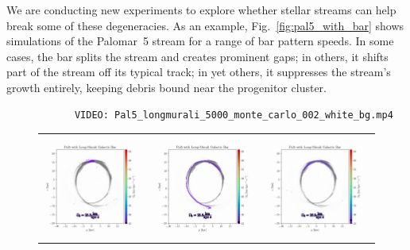         We are conducting new experiments to explore whether stellar streams can help break some of these degeneracies. As an example, Fig.~\ref{fig:pal5_with_bar} shows simulations of the Palomar~5 stream for a range of bar pattern speeds. In some cases, the bar splits the stream and creates prominent gaps; in others, it shifts part of the stream off its typical track; in yet others, it suppresses the stream's growth entirely, keeping debris bound near the progenitor cluster.  

        \begin{verbatim}
            VIDEO: Pal5_longmurali_5000_monte_carlo_002_white_bg.mp4
        \end{verbatim}

        \begin{figure}
            \centering
            \begin{tabular}{ccc}
                \includegraphics[width=.32\linewidth]{images/frame_0002.png}&
                \includegraphics[width=.32\linewidth]{images/frame_0004.png}&
                \includegraphics[width=.32\linewidth]{images/frame_0008.png}\\
                

\end{tabular}
\end{figure}
